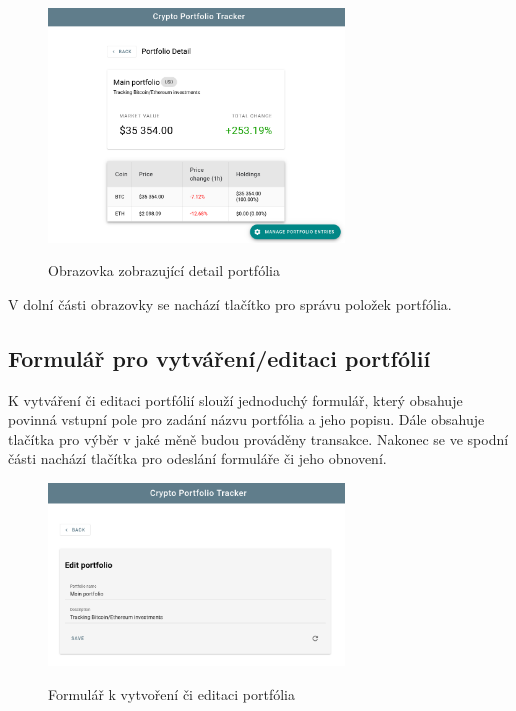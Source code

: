 \documentclass[12pt, a4paper]{article}
\begin{document}
    \begin{figure}[!ht]
        \centering
        {\includegraphics[width=0.7\textwidth]{img/cpt-screenshots/portfolio-detail.png}}
        \caption{Obrazovka zobrazující detail portfólia}
        \label{fig:portfolio-detail}
    \end{figure}
    
    V dolní části obrazovky se nachází tlačítko pro správu položek portfólia.
    
    \subsection{Formulář pro vytváření/editaci portfólií}
    K vytváření či editaci portfólií slouží jednoduchý formulář, který obsahuje povinná vstupní pole pro zadání názvu portfólia a jeho popisu.
    Dále obsahuje tlačítka pro výběr v jaké měně budou prováděny transakce.
    Nakonec se ve spodní části nachází tlačítka pro odeslání formuláře či jeho obnovení.

    \begin{figure}[!ht]
        \centering
        {\includegraphics[width=0.7\textwidth]{img/cpt-screenshots/portfolio-form.png}}
        \caption{Formulář k vytvoření či editaci portfólia}
        \label{fig:portfolio-form}
    \end{figure}
\end{document}
